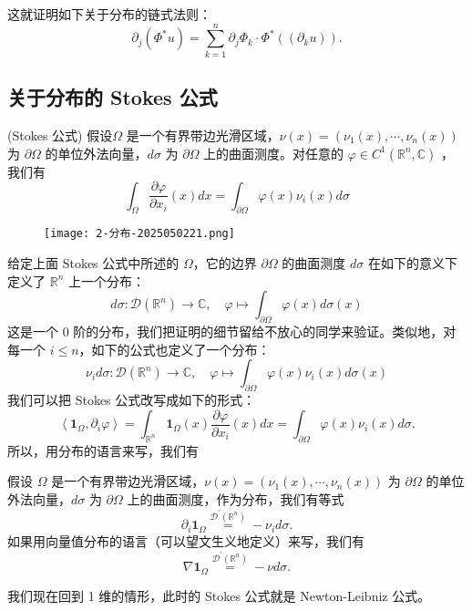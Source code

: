这就证明如下关于分布的链式法则：
\[
\partial_j\left(\Phi^* u\right)=\sum_{k=1}^n \partial_j \Phi_k \cdot \Phi^*\left(\left(\partial_k u\right)\right) .
\]
\subsection{关于分布的 Stokes 公式}

\begin{theorem}
(Stokes 公式) 假设$\Omega$ 是一个有界带边光滑区域，$\nu(x)=\left(\nu_1(x), \cdots, \nu_n(x)\right)$ 为 $\partial \Omega$ 的单位外法向量，$d \sigma$ 为 $\partial \Omega$ 上的曲面测度。对任意的 $\varphi \in C^1\left(\mathbb{R}^n, \mathbb{C}\right)$ ，我们有
\[
\int_{\Omega} \frac{\partial \varphi}{\partial x_i}(x) d x=\int_{\partial \Omega} \varphi(x) \nu_i(x) d \sigma
\]
\end{theorem}
\begin{figure}[H]
\centering
\texttt{[image: 2-分布-2025050221.png]}
\label{}
\end{figure}

给定上面 Stokes 公式中所述的 $\Omega$，它的边界 $\partial \Omega$ 的曲面测度 $d \sigma$ 在如下的意义下定义了 $\mathbb{R}^n$ 上一个分布：
\[
d \sigma: \mathcal{D}\left(\mathbb{R}^n\right) \rightarrow \mathbb{C}, \quad \varphi \mapsto \int_{\partial \Omega} \varphi(x) d \sigma(x)
\]
这是一个 0 阶的分布，我们把证明的细节留给不放心的同学来验证。类似地，对每一个 $i \leqslant n$，如下的公式也定义了一个分布：
\[
\nu_i d \sigma: \mathcal{D}\left(\mathbb{R}^n\right) \rightarrow \mathbb{C}, \quad \varphi \mapsto \int_{\partial \Omega} \varphi(x) \nu_i(x) d \sigma(x)
\]
我们可以把 Stokes 公式改写成如下的形式：
\[
\left\langle\mathbf{1}_{\Omega}, \partial_i \varphi\right\rangle=\int_{\mathbb{R}^n} \mathbf{1}_{\Omega}(x) \frac{\partial \varphi}{\partial x_i}(x) d x=\int_{\partial \Omega} \varphi(x) \nu_i(x) d \sigma .
\]
所以，用分布的语言来写，我们有

\begin{theorem}[Stokes 公式]
假设 $\Omega$ 是一个有界带边光滑区域，$\nu(x)=\left(\nu_1(x), \cdots, \nu_n(x)\right)$ 为 $\partial \Omega$ 的单位外法向量，$d \sigma$ 为 $\partial \Omega$ 上的曲面测度，作为分布，我们有等式
\[
\partial_i \mathbf{1}_{\Omega} \stackrel{\mathcal{D}^{\prime}\left(\mathbb{R}^n\right)}{=}-\nu_i d \sigma .
\]如果用向量值分布的语言（可以望文生义地定义）来写，我们有
\[
\nabla \mathbf{1}_{\Omega} \stackrel{\mathcal{D}^{\prime}\left(\mathbb{R}^n\right)}{=}-\nu d \sigma .
\]
\end{theorem}
我们现在回到 1 维的情形，此时的 Stokes 公式就是 Newton-Leibniz 公式。


